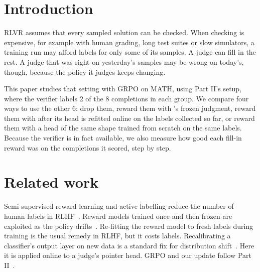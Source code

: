 
\section{Introduction}\label{sec:intro}

RLVR assumes that every sampled solution can be checked. When checking is expensive, for example with human grading,
long test suites or slow simulators, a training run may afford labels for only some of its samples. A judge can fill in
the rest. A judge that was right on yesterday's samples may be wrong on today's, though, because the policy it judges
keeps changing.

This paper studies that setting with GRPO on MATH, using Part II's setup, where the verifier labels 2 of the 8
completions in each group. We compare four ways to use the other 6: drop them, reward them with \kev{}'s frozen
judgment, reward them with \kev{} after its head is refitted online on the labels collected so far, or reward them with
a head of the same shape trained from scratch on the same labels. Because the verifier is in fact available, we also
measure how good each fill-in reward was on the completions it scored, step by step.

\section{Related work}\label{sec:related}

Semi-supervised reward learning and active labelling reduce the number of human labels in RLHF~\cite{ouyang2022training}.
Reward models trained once and then frozen are exploited as the policy drifts~\cite{gao2023scaling}. Re-fitting the
reward model to fresh labels during training is the usual remedy in RLHF, but it costs labels. Recalibrating a
classifier's output layer on new data is a standard fix for distribution shift~\cite{guo2017calibration}. Here it is
applied online to a judge's pointer head. GRPO and our update follow Part II~\cite{shao2024deepseekmath,liu2026tricks}.

